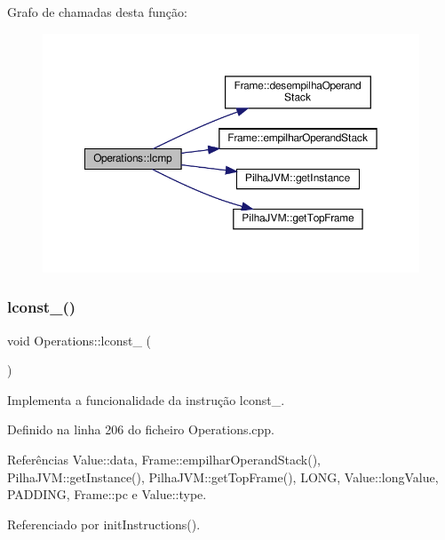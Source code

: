 Grafo de chamadas desta função\+:\nopagebreak
\begin{figure}[H]
\begin{center}
\leavevmode
\includegraphics[width=350pt]{classOperations_a7ad4ad0e417096686b55dde9142b830a_cgraph}
\end{center}
\end{figure}
\mbox{\label{classOperations_a89586a819a6e67c2168d7d6e43f087ef}} 
\subsubsection{\texorpdfstring{lconst\+\_()}{lconst\_0()}}
{\footnotesize\ttfamily void Operations\+::lconst\+\_ (\begin{DoxyParamCaption}{ }\end{DoxyParamCaption})\hspace{0.3cm}{\ttfamily [private]}}



Implementa a funcionalidade da instrução lconst\+\_. 



Definido na linha 206 do ficheiro Operations.\+cpp.



Referências Value\+::data, Frame\+::empilhar\+Operand\+Stack(), Pilha\+J\+V\+M\+::get\+Instance(), Pilha\+J\+V\+M\+::get\+Top\+Frame(), L\+O\+NG, Value\+::long\+Value, P\+A\+D\+D\+I\+NG, Frame\+::pc e Value\+::type.



Referenciado por init\+Instructions().

